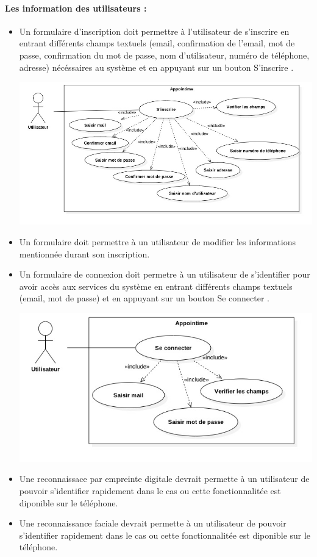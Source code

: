 \documentclass{article}
\begin{document}
\paragraph{Les information des utilisateurs :}
\begin{itemize}
 \item Un formulaire d'inscription doit permettre à l'utilisateur de
   s'inscrire en entrant différents champs textuels (email,
   confirmation de l'email, mot de
   passe, confirmation du mot de passe, nom d'utilisateur, numéro de téléphone, adresse) nécéssaires au
   système et en appuyant sur
   un bouton \og S'inscrire \fg{}.

\includegraphics[scale=0.5]{ShematDiagrammes/useCaseInscription.jpg}

\item Un formulaire doit permettre à un utilisateur de modifier les
  informations mentionnée durant son inscription.
\item Un formulaire de connexion doit permetre à un utilisateur de
  s'identifier pour avoir accès aux services du système en entrant
  différents champs textuels (email, mot de passe) et en appuyant sur
  un bouton \og Se connecter \fg{}.

\includegraphics[scale=0.5]{ShematDiagrammes/useCaseConnexion.jpg}

\item Une reconnaissace par empreinte digitale devrait permette à un
  utilisateur de pouvoir s'identifier rapidement dans le cas ou cette
  fonctionnalitée est diponible sur le téléphone.
\item Une reconnaissance faciale devrait permette à un
  utilisateur de pouvoir s'identifier rapidement dans le cas ou cette
  fonctionnalitée est diponible sur le téléphone.
\end{itemize}
\end{document}

